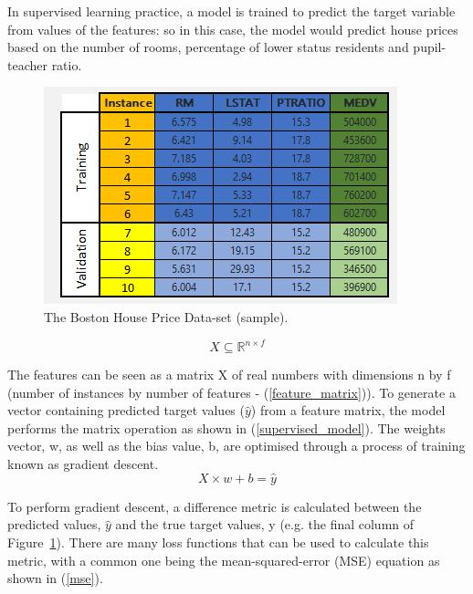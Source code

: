 \noindent
In supervised learning practice, a model is trained to predict the target variable from values of the features: so in this case, the model would predict house prices based on the number of rooms, percentage of lower status residents and pupil-teacher ratio. 
\\

\begin{figure}[ht]
	\centering
	\includegraphics[scale=0.75]{Figures/boston.png}
	\caption{The Boston House Price Data-set (sample).}
	\label{fig:boston}
\end{figure}

\begin{equation} \label{feature_matrix}
	X \subseteq \mathbb{R}^{n \times f}
\end{equation}

\noindent
The features can be seen as a matrix X of real numbers with dimensions n by f (number of instances by number of features - (\ref{feature_matrix})). To generate a vector containing predicted target values ($\hat{y}$) from a feature matrix, the model performs the matrix operation as shown in (\ref{supervised_model}). The weights vector, w, as well as the bias value, b, are optimised through a process of training known as gradient descent. 
\\

\begin{equation} \label{supervised_model}
	X \times w + b = \hat{y}
\end{equation}

\noindent
To perform gradient descent, a difference metric is calculated between the predicted values, $\hat{y}$ and the true target values, y (e.g. the final column of Figure~\ref{fig:boston}). There are many loss functions that can be  used to calculate this metric, with a common one being the mean-squared-error (MSE) equation as shown in (\ref{mse}).
\\

